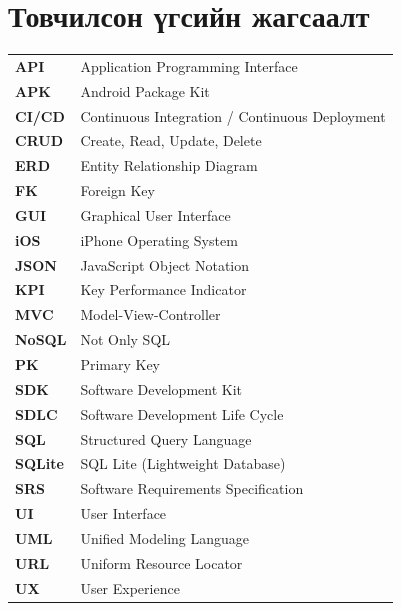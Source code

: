 \newpage
\thispagestyle{empty}

\section*{Товчилсон үгсийн жагсаалт}

\begin{tabular}{@{}l p{12cm}}
\textbf{API} & Application Programming Interface \\
\textbf{APK} & Android Package Kit \\
\textbf{CI/CD} & Continuous Integration / Continuous Deployment \\
\textbf{CRUD} & Create, Read, Update, Delete \\
\textbf{ERD} & Entity Relationship Diagram \\
\textbf{FK} & Foreign Key \\
\textbf{GUI} & Graphical User Interface \\
\textbf{iOS} & iPhone Operating System \\
\textbf{JSON} & JavaScript Object Notation \\
\textbf{KPI} & Key Performance Indicator \\
\textbf{MVC} & Model-View-Controller \\
\textbf{NoSQL} & Not Only SQL \\
\textbf{PK} & Primary Key \\
\textbf{SDK} & Software Development Kit \\
\textbf{SDLC} & Software Development Life Cycle \\
\textbf{SQL} & Structured Query Language \\
\textbf{SQLite} & SQL Lite (Lightweight Database) \\
\textbf{SRS} & Software Requirements Specification \\
\textbf{UI} & User Interface \\
\textbf{UML} & Unified Modeling Language \\
\textbf{URL} & Uniform Resource Locator \\
\textbf{UX} & User Experience \\
\end{tabular}
